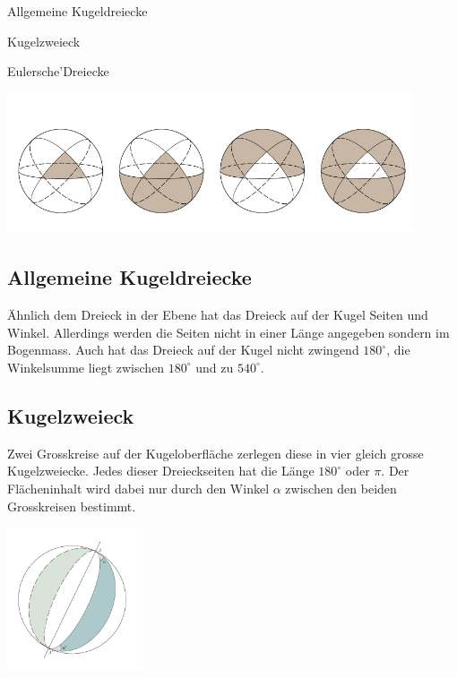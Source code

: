 \begin{refsection}
\begin{compactitem}
\item Allgemeine Kugeldreiecke
\item Kugelzweieck
\item Eulersche’Dreiecke
\end{compactitem}

\begin{center}
        \includegraphics[width=0.9\textwidth]{kugel/Dreieckarten.jpg}
\end{center}

\subsection{Allgemeine Kugeldreiecke}

Ähnlich dem Dreieck in der Ebene hat das Dreieck auf der Kugel Seiten und Winkel. Allerdings werden die Seiten nicht in einer Länge angegeben sondern im Bogenmass. Auch hat das Dreieck auf der Kugel nicht zwingend $180^{\circ}$, die Winkelsumme liegt zwischen $180^{\circ}$ und zu $540^{\circ}$.

\subsection{Kugelzweieck}

Zwei Grosskreise auf der Kugeloberfläche zerlegen diese in vier gleich grosse Kugelzweiecke. 
Jedes dieser Dreieckseiten hat die Länge
$180^{\circ}$ oder $\pi$.
Der Flächeninhalt wird dabei nur durch den Winkel $\alpha$ zwischen den beiden Grosskreisen bestimmt.

\begin{center}
        \includegraphics[width=0.3\textwidth]{kugel/Zweieck.jpg}
\end{center}


\end{refsection}
